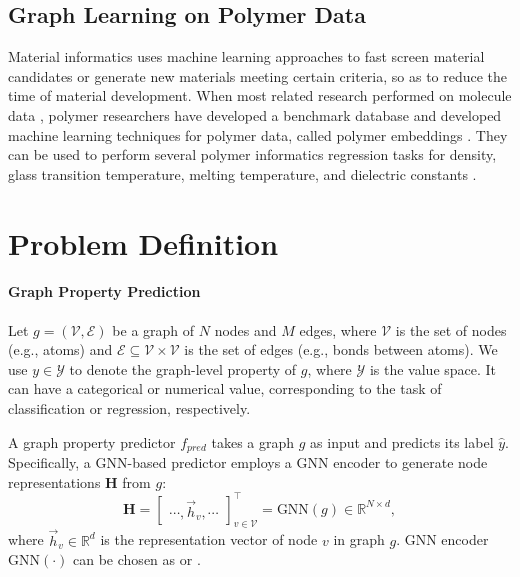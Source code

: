 \documentclass[sigconf]{acmart}
\begin{document}
\subsection{Graph Learning on Polymer Data}

Material informatics uses machine learning approaches to fast screen material candidates or generate new materials meeting certain criteria, so as to reduce the time of material development. When most related research performed on molecule data \cite{guo2021few}, polymer researchers have developed a benchmark database and developed machine learning techniques for polymer data, called polymer embeddings \cite{kim2018polymer,chen2021polymer}. They can be used to perform several polymer informatics regression tasks for density, glass transition temperature, melting temperature, and dielectric constants \cite{ma2019evaluating,ma2020pi1m,wei2021thermal}.
 
\section{Problem Definition}
\label{sec:problem}
\paragraph{Graph Property Prediction}
Let $g = (\mathcal{V}, \mathcal{E})$ be a graph of $N$ nodes and $M$ edges, where $\mathcal{V}$ is the set of nodes (e.g., atoms) and $\mathcal{E} \subseteq \mathcal{V} \times \mathcal{V}$ is the set of edges (e.g., bonds between atoms). We use $y \in \mathcal{Y}$ to denote the graph-level property of $g$, where $\mathcal{Y}$ is the value space. It can have a categorical or numerical value, corresponding to the task of classification or regression, respectively.

A graph property predictor $f_{pred}$ takes a graph $g$ as input and predicts its label $\hat{y}$. Specifically, a GNN-based predictor employs a GNN encoder to generate node representations $\mathbf{H}$ from $g$:
\begin{equation}
\label{eq:gnn}
\mathbf{H} = \begin{bmatrix}
    \cdots, \vec{h}_v, \cdots
    \end{bmatrix}_{v \in \mathcal{V}}^\top
    = \text{GNN}(g) \in \mathbb{R}^{N \times d},
\end{equation}
where $\vec{h}_v \in \mathbb{R}^d$ is the representation vector of node $v$ in graph $g$. GNN encoder $\text{GNN}(\cdot)$ can be chosen as \gcn \cite{kipf2017semi} or \gin \cite{xu2018how}.
\end{document}
